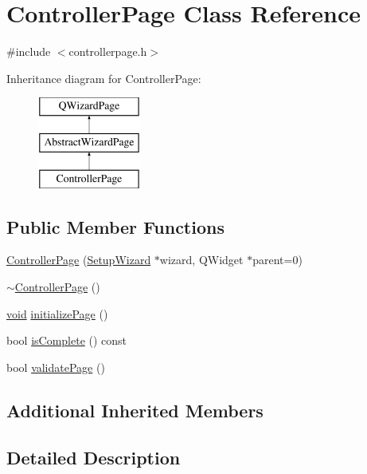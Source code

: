 \hypertarget{class_controller_page}{\section{Controller\-Page Class Reference}
\label{class_controller_page}
}


{\ttfamily \#include $<$controllerpage.\-h$>$}

Inheritance diagram for Controller\-Page\-:\begin{figure}[H]
\begin{center}
\leavevmode
\includegraphics[height=3.000000cm]{class_controller_page}
\end{center}
\end{figure}
\subsection*{Public Member Functions}
\begin{DoxyCompactItemize}
\item 
\hyperlink{group___controller_page_ga82de0473ed3c57a5a89736525b0336f2}{Controller\-Page} (\hyperlink{class_setup_wizard}{Setup\-Wizard} $\ast$wizard, Q\-Widget $\ast$parent=0)
\item 
\hyperlink{group___controller_page_ga5573a5d2568f7e15528658e32de887d3}{$\sim$\-Controller\-Page} ()
\item 
\hyperlink{group___u_a_v_objects_plugin_ga444cf2ff3f0ecbe028adce838d373f5c}{void} \hyperlink{group___controller_page_gaf9c2ad04637cf0961bd7bb5d5d5200c4}{initialize\-Page} ()
\item 
bool \hyperlink{group___controller_page_gae5ede361df9cdf86bf53ce39ef72267c}{is\-Complete} () const 
\item 
bool \hyperlink{group___controller_page_ga91bcb88db666a8d5585553520d1247b9}{validate\-Page} ()
\end{DoxyCompactItemize}
\subsection*{Additional Inherited Members}


\subsection{Detailed Description}


